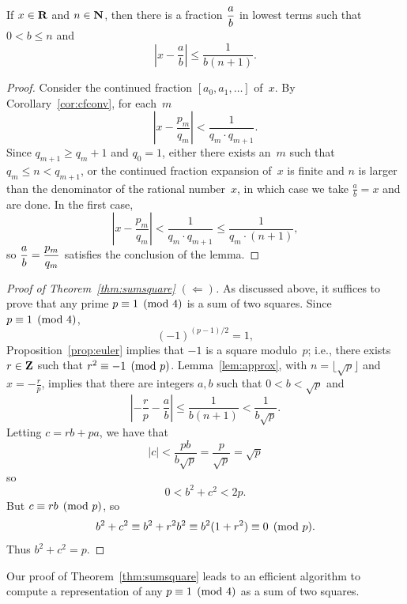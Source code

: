 \begin{lemma}\label{lem:approx}
If $x\in\mathbf{R}$ and $n\in\mathbf{N}$, then there is a fraction $\displaystyle\frac{a}{b}$
in lowest terms such that $0<b\leq n$ and
$$\left| x - \frac{a}{b} \right| \leq \frac{1}{b(n+1)}.$$
\end{lemma}
\begin{proof}
Consider the continued fraction
$[a_0,a_1,\ldots]$ of~$x$.
By Corollary~\ref{cor:cfconv}, for each~$m$
$$
 \left| x - \frac{p_m}{q_m}\right|
  < \frac{1}{q_m \cdot q_{m+1}}.
$$
Since $q_{m+1}\geq q_m + 1$ and $q_0=1$,
either there exists an~$m$ such that $q_m\leq n < q_{m+1}$, or the
continued fraction expansion of~$x$ is finite and $n$ is larger
than the denominator of the rational number~$x$, in which case
we take $\frac{a}{b}=x$ and are done.  In the first
case,
$$
  \left| x - \frac{p_m}{q_m}\right|
   < \frac{1}{q_m \cdot q_{m+1}}
      \leq \frac{1}{q_m \cdot (n+1)},$$
so $\displaystyle\frac{a}{b} = \frac{p_m}{q_m}$ satisfies the conclusion of
the lemma.
\end{proof}

\begin{proof}[Proof of Theorem~\ref{thm:sumsquare} $\left(\Longleftarrow\right)$]
As discussed above, it suffices to prove that any prime
$p\equiv 1\pmod{4}$ is a sum of two squares. Since $p\equiv 1\pmod{4}$,
$$
  (-1)^{(p-1)/2} = 1,
$$
Proposition~\ref{prop:euler} implies that
$-1$ is a square modulo~$p$; i.e., there exists~$r\in\mathbf{Z}$ such
that $r^2\equiv -1\pmod{p}$.
Lemma~\ref{lem:approx}, with $n=\lfloor \sqrt{p}\rfloor$
and $x=-\frac{r}{p}$,
implies that there are integers $a, b$ such that
$0<b<\sqrt{p}$ and
$$
 \left| -\frac{r}{p} - \frac{a}{b}\right| \leq\frac{1}{b(n+1)} < \frac{1}{b\sqrt{p}}.
$$
Letting $c = rb + pa$, we have that
$$
  |c| < \frac{pb}{b\sqrt{p}} = \frac{p}{\sqrt{p}} = \sqrt{p}
$$
so
$$
   0 < b^2 + c^2 < 2p.
$$
But $c \equiv rb\pmod{p}$, so
$$
  b^2 + c^2 \equiv b^2 + r^2 b^2 \equiv b^2(1+r^2) \equiv 0\pmod{p}.
$$
Thus $b^2 + c^2 = p$.
\end{proof}

\begin{remark}
Our proof of Theorem~\ref{thm:sumsquare} leads to an efficient
algorithm to compute a representation of any $p\equiv 1\pmod{4}$
as a sum of two squares.
\end{remark}

